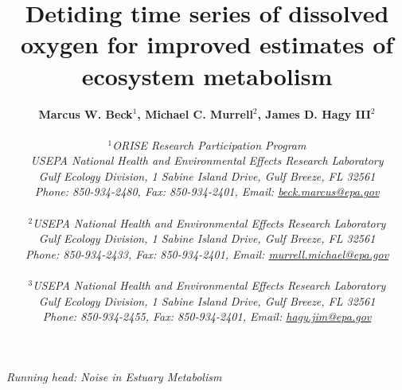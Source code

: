 \begin{singlespace}
\title{{\bf {\Large Detiding time series of dissolved oxygen for improved estimates of ecosystem metabolism}}}
\author{
  {\bf {\normalsize Marcus W. Beck$^1$, Michael C. Murrell$^2$, James D. Hagy III$^2$}}
  \\\\{\textit {\normalsize $^1$ORISE Research Participation Program}}
  \\{\textit {\normalsize USEPA National Health and Environmental Effects Research Laboratory}}
	\\{\textit {\normalsize Gulf Ecology Division, 1 Sabine Island Drive, Gulf Breeze, FL 32561}}
	\\{\textit {\normalsize Phone: 850-934-2480, Fax: 850-934-2401, Email: \href{mailto:beck.marcus@epa.gov}{beck.marcus@epa.gov}}}
  \\\\{\textit {\normalsize $^2$USEPA National Health and Environmental Effects Research Laboratory}}
	\\{\textit {\normalsize Gulf Ecology Division, 1 Sabine Island Drive, Gulf Breeze, FL 32561}}
	\\{\textit {\normalsize Phone: 850-934-2433, Fax: 850-934-2401, Email: \href{mailto:murrell.michael@epa.gov}{murrell.michael@epa.gov}}}
  \\\\{\textit {\normalsize $^3$USEPA National Health and Environmental Effects Research Laboratory}}
	\\{\textit {\normalsize Gulf Ecology Division, 1 Sabine Island Drive, Gulf Breeze, FL 32561}}
	\\{\textit {\normalsize Phone: 850-934-2455, Fax: 850-934-2401, Email: \href{mailto:hagy.jim@epa.gov}{hagy.jim@epa.gov}}}
	}
\date{}
\maketitle
\vfill{\centerline{\textit {\normalsize Running head: Noise in Estuary Metabolism}}}
\end{singlespace}
\clearpage